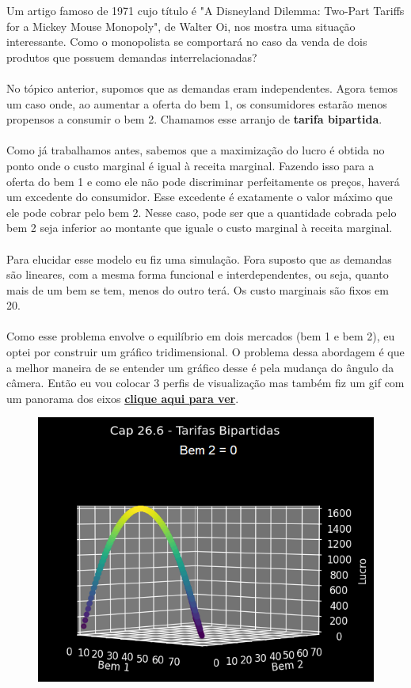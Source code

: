 \documentclass[a4paper,11pt,oneside]{book}
\theoremstyle{definition}
\theoremstyle{break}
\begin{document}
Um artigo famoso de 1971 cujo título é "A Disneyland Dilemma: Two-Part Tariffs for a Mickey Mouse Monopoly", de Walter Oi, nos mostra uma situação interessante. Como o monopolista se comportará no caso da venda de dois produtos que possuem demandas interrelacionadas?
\\
\\
No tópico anterior, supomos que as demandas eram independentes. Agora temos um caso onde, ao aumentar a oferta do bem 1, os consumidores estarão menos propensos a consumir o bem 2. Chamamos esse arranjo de \textbf{tarifa bipartida}.
\\
\\
Como já trabalhamos antes, sabemos que a maximização do lucro é obtida no ponto onde o custo marginal é igual à receita marginal. Fazendo isso para a oferta do bem 1 e como ele não pode discriminar perfeitamente os preços, haverá um excedente do consumidor. Esse excedente é exatamente o valor máximo que ele pode cobrar pelo bem 2. Nesse caso, pode ser que a quantidade cobrada pelo bem 2 seja inferior ao montante que iguale o custo marginal à receita marginal.
\\
\\
Para elucidar esse modelo eu fiz uma simulação. Fora suposto que as demandas são lineares, com a mesma forma funcional e interdependentes, ou seja, quanto mais de um bem se tem, menos do outro terá. Os custo marginais são fixos em 20.
\\
\\
Como esse problema envolve o equilíbrio em dois mercados (bem 1 e bem 2), eu optei por construir um gráfico tridimensional. O problema dessa abordagem é que a melhor maneira de se entender um gráfico desse é pela mudança do ângulo da câmera. Então eu vou colocar 3 perfis de visualização mas também fiz um gif com um panorama dos eixos \href{https://github.com/brunoruas2/Meus_Estudos/blob/main/Microeconomia/Microeconomics\%20-\%20Hal\%20Varian/images/cap26_6-tarifas_bipartidas.gif}{\textbf{clique aqui para ver}}.

\begin{figure}[H]
\centering
\includegraphics[scale=0.6]{cap26_6-tarifas_bipartidas1.png}
\end{figure}
\end{document}
